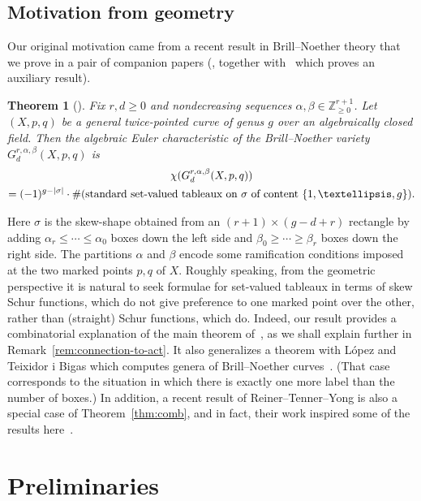 \documentclass[11pt]{article}
\newtheorem{theo}[theorem]{Theorem}
\theoremstyle{definition}
\newcommand{\ZZ}{\mathbb{Z}}
\newcommand{\Grdab}{G^{r,\alpha,\beta}_d}
\begin{document}
\subsection*{Motivation from geometry} 
Our original motivation came from a recent result in Brill--Noether theory that we prove in a pair of companion papers (\cite{chan-pflueger-euler}, together with~\cite{chan-pflueger-relative} which proves an auxiliary result). 
\begin{theo}[\cite{chan-pflueger-euler}] Fix $r,d\ge 0$ and nondecreasing sequences $\alpha,\beta\in\ZZ^{r+1}_{\ge 0}$. Let $(X,p,q)$ be a general twice-pointed curve of genus $g$ over an algebraically closed field.
Then the algebraic Euler characteristic of the Brill--Noether variety $\Grdab(X,p,q)$ is 
\begin{multline*}
\chi(\Grdab(X,p,q))\\ = (-1)^{g-|\sigma|} \cdot \#(\text{standard set-valued tableaux on $\sigma$ of %
content }\{1,\ldots,g\}).
\end{multline*}
\end{theo}	 
\noindent Here $\sigma$ is the skew-shape obtained from an $(r+1)\times (g-d+r)$ rectangle by adding $\alpha_r \le \cdots \le \alpha_0$ boxes down the left side and $\beta_0\ge \cdots \ge \beta_r$ boxes down the right side. The partitions $\alpha$ and $\beta$ encode some ramification conditions imposed at the two marked points $p,q$ of $X$. Roughly speaking, from the geometric perspective it is natural to seek formulae for set-valued tableaux in terms of skew Schur functions, which do not give preference to one marked point over the other, rather than (straight) Schur functions, which do.
Indeed, 
our result provides a combinatorial explanation of the main theorem of~\cite{anderson-chen-tarasca-k-classes}, as we shall explain further in Remark~\ref{rem:connection-to-act}. It also generalizes a theorem with L\'opez and Teixidor i Bigas which computes genera of Brill--Noether curves~\cite{clpt}. (That case corresponds to the situation in which there is exactly one more label than the number of boxes.) 
In addition, a recent result of Reiner--Tenner--Yong 
is also a special case of Theorem~\ref{thm:comb}, and in fact, their work inspired some of the results here~\cite[Corollary~3.11]{reiner-tenner-yong}. 

\section{Preliminaries}\label{sec:prelim}
\end{document}

